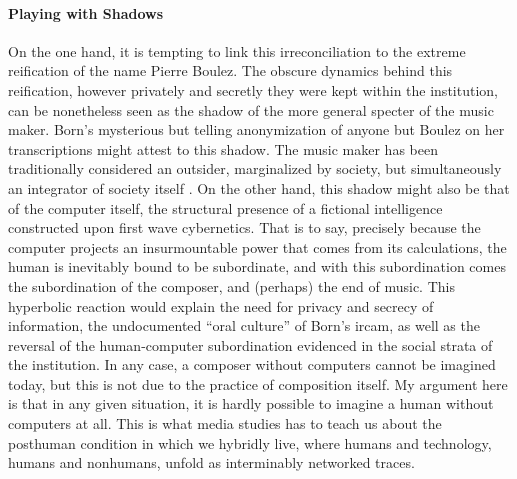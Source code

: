 \paragraph{Playing with Shadows}
On the one hand, it is tempting to link this irreconciliation to the extreme reification of the name Pierre Boulez. The obscure dynamics behind this reification, however privately and secretly they were kept within the institution, can be nonetheless seen as the shadow of the more general specter of the music maker. Born's mysterious but telling anonymization of anyone but Boulez on her transcriptions might attest to this shadow. The music maker has been traditionally considered an outsider, marginalized by society, but simultaneously an integrator of society itself \parencite[12]{Att77:Noi}. On the other hand, this shadow might also be that of the computer itself, the structural presence of a fictional intelligence constructed upon first wave cybernetics. That is to say, precisely because the computer projects an insurmountable power that comes from its calculations, the human is inevitably bound to be subordinate, and with this subordination comes the subordination of the composer, and (perhaps) the end of music. This hyperbolic reaction would explain the need for privacy and secrecy of information, the undocumented ``oral culture'' of Born's \gls{ircam}, as well as the reversal of the human-computer subordination evidenced in the social strata of the institution. In any case, a composer without computers cannot be imagined today, but this is not due to the practice of composition itself. My argument here is that in any given situation, it is hardly possible to imagine a human without computers at all. This is what media studies has to teach us about the posthuman condition in which we hybridly live, where humans and technology, humans and nonhumans, unfold as interminably networked traces.

